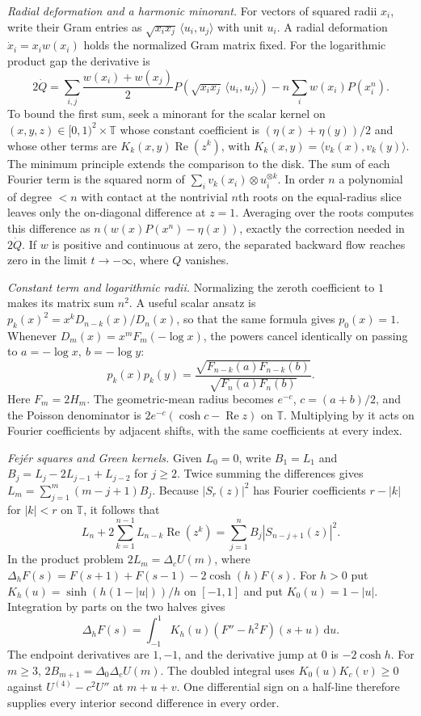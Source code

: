 \documentclass[10pt,twoside,reqno]{amsart}
\numberwithin{equation}{section}
\newcommand{\T}{\mathbb T}
\newcommand{\re}{\operatorname{Re}}
\newcommand{\dd}{\,\mathrm{d}}
\begin{document}
\noindent
\textit{Radial deformation and a harmonic minorant.}
For vectors of squared radii \(x_i\), write their Gram entries as
\(\sqrt{x_ix_j}\,\langle u_i,u_j\rangle\) with unit \(u_i\).
A radial deformation \(\dot x_i=x_i w(x_i)\) holds the normalized Gram
matrix fixed. For the logarithmic product gap the derivative is
\[
 2\dot Q=\sum_{i,j}\frac{w(x_i)+w(x_j)}2
         P(\sqrt{x_ix_j}\,\langle u_i,u_j\rangle)
         -n\sum_i w(x_i)P(x_i^n).
\]
To bound the first sum, seek a minorant for the scalar kernel on
\((x,y,z)\in[0,1)^2\times\T\) whose constant coefficient is
\((\eta(x)+\eta(y))/2\) and whose other terms are
\(K_k(x,y)\re(z^k)\), with \(K_k(x,y)=\langle v_k(x),v_k(y)\rangle\).
The minimum principle extends the comparison to the disk.
The sum of each Fourier term is the squared norm of
\(\sum_i v_k(x_i)\otimes u_i^{\otimes k}\).
In order \(n\) a polynomial of degree \(<n\) with contact at the nontrivial
\(n\)th roots on the equal-radius slice leaves only the on-diagonal
difference at \(z=1\). Averaging over the roots computes this difference as
\(n(w(x)P(x^n)-\eta(x))\), exactly the correction needed in \(2\dot Q\).
If \(w\) is positive and continuous at zero, the separated backward flow
reaches zero in the limit \(t\to-\infty\), where \(Q\) vanishes.

\medskip
\noindent
\textit{Constant term and logarithmic radii.}
Normalizing the zeroth coefficient to \(1\) makes its matrix sum \(n^2\).
A useful scalar ansatz is \(p_k(x)^2=x^kD_{n-k}(x)/D_n(x)\),
so that the same formula gives \(p_0(x)=1\). Whenever
\(D_m(x)=x^m F_m(-\log x)\), the powers cancel identically on passing to
\(a=-\log x,\ b=-\log y\):
\[
 p_k(x)p_k(y)=
 \frac{\sqrt{F_{n-k}(a)F_{n-k}(b)}}{\sqrt{F_n(a)F_n(b)}} .
\]
Here \(F_m=2H_m\). The geometric-mean radius becomes \(e^{-c}\),
\(c=(a+b)/2\), and the Poisson denominator is
\(2e^{-c}(\cosh c-\re z)\) on \(\T\). Multiplying by it acts on Fourier
coefficients by adjacent shifts, with the same coefficients at every index.

\medskip
\noindent
\textit{Fejér squares and Green kernels.}
Given \(L_0=0\), write \(B_1=L_1\) and
\(B_j=L_j-2L_{j-1}+L_{j-2}\) for \(j\ge2\).
Twice summing the differences gives \(L_m=\sum_{j=1}^m(m-j+1)B_j\).
Because \(|S_r(z)|^2\) has Fourier coefficients \(r-|k|\) for \(|k|<r\)
on \(\T\), it follows that
\[
 L_n+2\sum_{k=1}^{n-1}L_{n-k}\re(z^k)
 =\sum_{j=1}^n B_j|S_{n-j+1}(z)|^2.
\]
In the product problem \(2L_m=\Delta_c U(m)\), where
\(\Delta_h F(s)=F(s+1)+F(s-1)-2\cosh(h)F(s)\).
For \(h>0\) put \(K_h(u)=\sinh(h(1-|u|))/h\) on \([-1,1]\) and put
\(K_0(u)=1-|u|\). Integration by parts on the two halves gives
\[
 \Delta_h F(s)=\int_{-1}^1 K_h(u)(F''-h^2 F)(s+u)\dd u.
\]
The endpoint derivatives are \(1,-1\), and the derivative jump at \(0\)
is \(-2\cosh h\). For \(m\ge3\), \(2B_{m+1}=\Delta_0\Delta_c U(m)\).
The doubled integral uses \(K_0(u)K_c(v)\ge0\) against
\(U^{(4)}-c^2U''\) at \(m+u+v\). One differential sign on a half-line
therefore supplies every interior second difference in every order.
\end{document}

